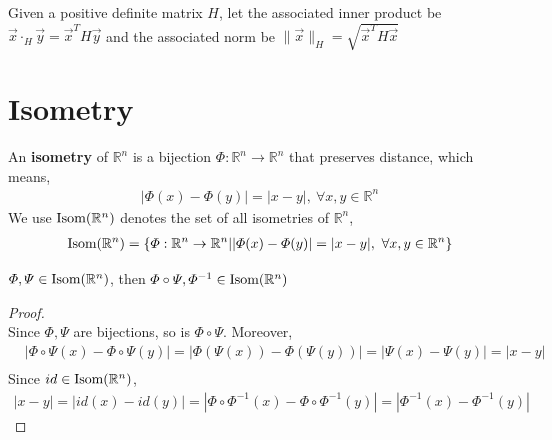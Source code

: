 \documentclass[11pt]{elegantbook}
\begin{document}
\begin{definition}
    Given a positive definite matrix $H$, let the associated inner product be $\vec{x}\cdot_H \vec{y}= \vec{x}^T H \vec{y}$ and the associated norm be $\|\vec{x}\|_H=\sqrt{\vec{x}^T H \vec{x}}$
\end{definition}
















\section{Isometry}
An \textbf{isometry} of $\mathbb{R}^n$ is a bijection $\varPhi :\mathbb{R}^n \rightarrow \mathbb{R}^n$ that preserves distance, which means,
\begin{equation}
    \begin{aligned}
        |\varPhi(x)-\varPhi(y)|=|x-y|,\ \forall x,y\in \mathbb{R}^n
    \end{aligned}
    \nonumber
\end{equation}
We use $\textnormal{Isom}(\mathbb{R}^n)$ denotes the set of all isometries of $\mathbb{R}^n$,
\begin{equation}
    \begin{aligned}
        \textnormal{Isom}(\mathbb{R}^n)=\{\varPhi:\mathbb{R}^n \rightarrow \mathbb{R}^n | |\varPhi(x)-\varPhi(y)|=|x-y|,\ \forall x,y\in \mathbb{R}^n\}
    \end{aligned}
    \nonumber
\end{equation}


\begin{proposition}
$\varPhi, \varPsi \in \textnormal{Isom}(\mathbb{R}^n)$, then $\varPhi\circ\varPsi, \varPhi^{-1}\in \textnormal{Isom}(\mathbb{R}^n)$
\end{proposition}
\begin{proof}
\quad\\
Since $\varPhi,\varPsi$ are bijections, so is $\varPhi\circ\varPsi$. Moreover,\\
\begin{equation}
    \begin{aligned}
        &|\varPhi\circ\varPsi(x)-\varPhi\circ\varPsi(y)|=|\varPhi(\varPsi(x))-\varPhi(\varPsi(y))|=|\varPsi(x)-\varPsi(y)|=|x-y|\\
    \end{aligned}
    \nonumber
\end{equation}
Since $id\in \textnormal{Isom} (\mathbb{R}^n)$,
\begin{equation}
    \begin{aligned}
        |x-y|=|id(x)-id(y)|=|\varPhi\circ\varPhi^{-1}(x)-\varPhi\circ\varPhi^{-1}(y)|=|\varPhi^{-1}(x)-\varPhi^{-1}(y)|
    \end{aligned}
    \nonumber
\end{equation}
\end{proof}
\end{document}
